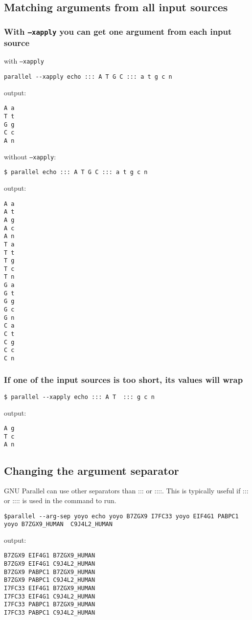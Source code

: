 \documentclass{article}
\begin{document}
\subsection{Matching arguments from all input sources}
\subsubsection{With \texttt{--xapply} you can get one argument from each input source}

with \texttt{--xapply}
\begin{lstlisting}
parallel --xapply echo ::: A T G C ::: a t g c n
\end{lstlisting}
output:
\begin{lstlisting}
A a
T t
G g
C c
A n
\end{lstlisting}

without \texttt{--xapply}:
\begin{lstlisting}
$ parallel echo ::: A T G C ::: a t g c n
\end{lstlisting}
output:
\begin{lstlisting}
A a
A t
A g
A c
A n
T a
T t
T g
T c
T n
G a
G t
G g
G c
G n
C a
C t
C g
C c
C n
\end{lstlisting}

\subsubsection{If one of the input sources is too short, its values will wrap}
\begin{lstlisting}
$ parallel --xapply echo ::: A T  ::: g c n
\end{lstlisting}
output:
\begin{lstlisting}
A g
T c
A n
\end{lstlisting}

\subsection{Changing the argument separator}
GNU Parallel can use other separators than ::: or ::::. This is typically useful if ::: or :::: is used in the command to run.
\begin{lstlisting}
$parallel --arg-sep yoyo echo yoyo B7ZGX9 I7FC33 yoyo EIF4G1 PABPC1 yoyo B7ZGX9_HUMAN  C9J4L2_HUMAN
\end{lstlisting}
output:
\begin{lstlisting}
B7ZGX9 EIF4G1 B7ZGX9_HUMAN
B7ZGX9 EIF4G1 C9J4L2_HUMAN
B7ZGX9 PABPC1 B7ZGX9_HUMAN
B7ZGX9 PABPC1 C9J4L2_HUMAN
I7FC33 EIF4G1 B7ZGX9_HUMAN
I7FC33 EIF4G1 C9J4L2_HUMAN
I7FC33 PABPC1 B7ZGX9_HUMAN
I7FC33 PABPC1 C9J4L2_HUMAN
\end{lstlisting}
\end{document}
